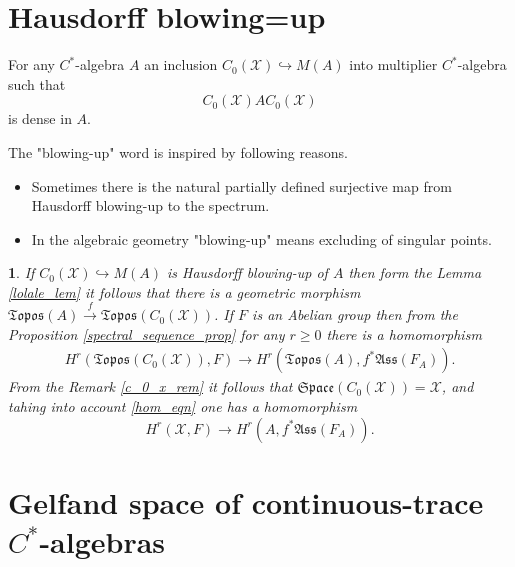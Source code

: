 \documentclass{beamer}
\theoremstyle{plain}
\newtheorem{empt}[prop]{}%
\newcommand{\be}{\begin{equation}}
\newcommand{\ee}{\end{equation}}
\newcommand{\bean}{\begin{eqnarray*}}
\newcommand{\eean}{\end{eqnarray*}}
\newcommand{\sX}{\mathcal{X}}       %
\newcommand{\hookto}{\hookrightarrow}        %
\begin{document}
\section{Hausdorff blowing=up}
\begin{frame}
\begin{definition}\label{blowing_up_defn}
	For any $C^*$-algebra $A$ 
	an inclusion $C_0\left( \sX\right) \hookto M\left(A \right)$ into multiplier $C^*$-algebra  such that
	$$
	C_0\left( \sX\right)AC_0\left( \sX\right)
	$$
	is dense in $A$.
\end{definition}
The "blowing-up" word is inspired by following reasons.
\begin{itemize}
	\item Sometimes there is  the natural partially defined  surjective  map from  Hausdorff blowing-up to the spectrum.
	\item  In the algebraic geometry   "blowing-up" means  excluding of singular points.
\end{itemize}
\end{frame}
\begin{frame}
\begin{empt}\label{c_i0_rem}
	If $C_0\left( \sX\right) \hookto M\left(A \right)$ is  \textit{Hausdorff blowing-up of } $A$ then form the Lemma \ref{lolale_lem} it follows that there is a geometric morphism $\mathfrak{Topos}\left( A\right)\xrightarrow{f}\mathfrak{Topos}\left(C_0(\sX)\right)$.  If $F$ is an Abelian group then from the  Proposition \ref{spectral_sequence_prop} for any $r\ge 0$ there is a homomorphism
	\bean
	H^r\left(\mathfrak{Topos}\left( C_0\left( \sX\right)\right) , F \right) \xrightarrow{} H^r \left(\mathfrak{Topos}\left( A\right), f^*\mathfrak{Ass} \left( F_A\right)\right).
	\eean
	From the Remark \ref{c_0_x_rem} it follows that $\mathfrak{Space}\left(C_0\left( \sX\right)  \right) = \sX$, and tahing into account \eqref{hom_eqn} one has a homomorphism
	\be\label{hom_to_x_eqn}
	H^r\left(\sX, F \right) \xrightarrow{} H^r \left(A, f^*\mathfrak{Ass} \left( F_A\right)\right).
	\ee
	
\end{empt}

\end{frame}
\section{Gelfand space of continuous-trace $C^*$-algebras}
\end{document}

